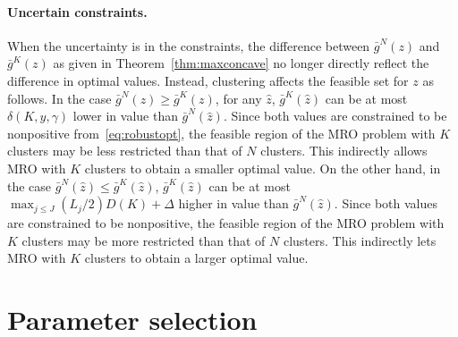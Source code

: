 {{\paragraph{Uncertain constraints.}%
\label{par:uncertain_constraints_max}
When the uncertainty is in the constraints, the difference between $\bar{g}^N(z)$ and $\bar{g}^K(z)$ as given in Theorem~\ref{thm:maxconcave} no longer directly reflect the difference in optimal values.
Instead, clustering affects the feasible set for $z$ as follows.
In the case $\bar{g}^N(z) \geq \bar{g}^K(z)$, for any $\hat{z}$, $\bar{g}^K(\hat{z})$ can be at most $\delta(K,y,\gamma)$ lower in value than $\bar{g}^N(\hat{z})$.
Since both values are constrained to be nonpositive from~\eqref{eq:robustopt}, the feasible region of the \gls{MRO} problem with $K$ clusters may be less restricted than that of $N$ clusters. This indirectly allows \gls{MRO} with $K$ clusters to obtain a smaller optimal value.
On the other hand, in the case $\bar{g}^N(\hat{z}) \leq \bar{g}^K(\hat{z})$, 
$\bar{g}^K(\hat{z})$ can be at most $\max_{j\leq J}(L_j/2)D(K) + \Delta$ higher in value than $\bar{g}^N(\hat{z})$. 
Since both values are constrained to be nonpositive, the feasible region of the \gls{MRO} problem with $K$ clusters may be more restricted than that of $N$ clusters. This indirectly lets \gls{MRO} with $K$ clusters to obtain a larger optimal value.
}


\section{Parameter selection }
\label{sec:parameter_selection}

}
